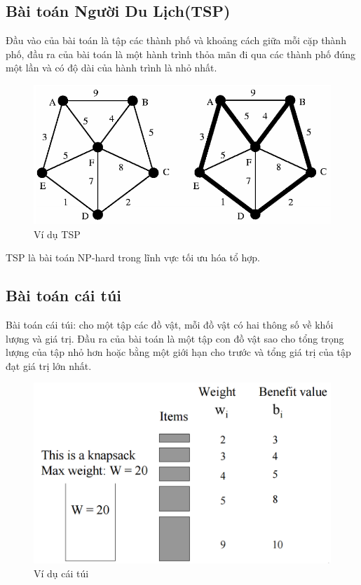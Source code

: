 \documentclass[a4paper,12pt]{report}
\begin{document}
\subsection{Bài toán Người Du Lịch(TSP)}
Đầu vào của bài toán là tập các thành phố và khoảng cách giữa mỗi cặp thành phố, đầu ra của bài toán là một hành trình thỏa mãn đi qua các thành phố đúng một lần và có độ dài của hành trình là nhỏ nhất.\\

\begin{figure}[H]
\center
\includegraphics[scale=0.5]{TSP_example.PNG}
\caption{Ví dụ TSP}
\end{figure}

TSP là bài toán NP-hard trong lĩnh vực tối ưu hóa tổ hợp.
\subsection{Bài toán cái túi}
Bài toán cái túi: cho một tập các đồ vật, mỗi đồ vật có hai thông số về khối lượng và giá trị. Đầu ra của bài toán là một tập con đồ vật sao cho tổng trọng lượng của tập nhỏ hơn hoặc bằng một giới hạn cho trước và tổng giá trị của tập đạt giá trị lớn nhất.
\begin{figure}[H]
\center
\includegraphics[scale=0.5]{KP_example.PNG}
\caption{Ví dụ cái túi}
\end{figure}
\end{document}

